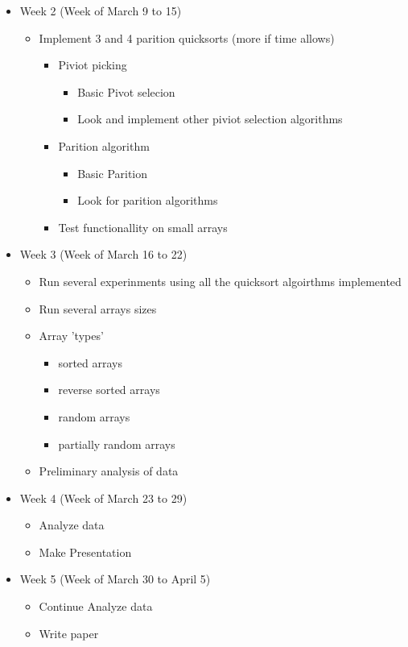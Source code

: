 \documentclass[12pt]{report}
\begin{document}
\begin{itemize}
		\item Week 2 (Week of March 9 to 15)
		\begin{itemize}
			\item Implement 3 and 4 parition quicksorts (more if time allows)
			\begin{itemize}
				\item Piviot picking
				\begin{itemize}
					\item Basic Pivot selecion
					\item Look and implement other piviot selection algorithms
				\end{itemize}
				\item Parition algorithm
				\begin{itemize}
					\item Basic Parition 
					\item Look for parition algorithms
				\end{itemize}
				\item Test functionallity on small arrays
			\end{itemize}
		\end{itemize}
		
		\item Week 3 (Week of March 16 to 22)
		\begin{itemize}
			\item Run several experinments using all the quicksort algoirthms implemented
			\item Run several arrays sizes
			\item Array 'types'
			\begin{itemize}
				\item sorted arrays
				\item reverse sorted arrays
				\item random arrays
				\item partially random arrays
			\end{itemize}
			\item Preliminary analysis of data
		\end{itemize}
		\item Week 4 (Week of March 23 to 29)
		\begin{itemize}
			\item Analyze data
			\item Make Presentation    
		\end{itemize}
		\item Week 5 (Week of March 30 to April 5)
		\begin{itemize}
			\item Continue Analyze data
			\item Write paper
		\end{itemize}
	\end{itemize}
\end{document}
